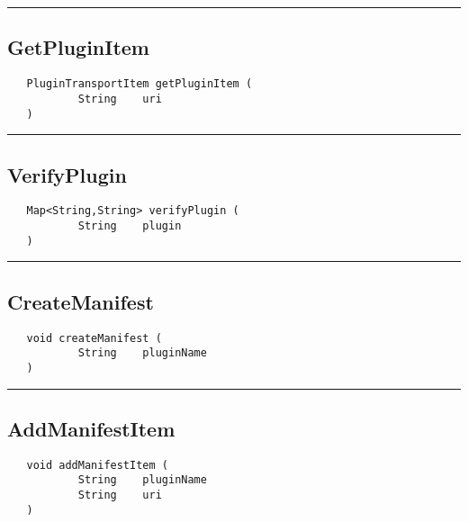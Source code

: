 \rule{15cm}{2pt}
\subsection{GetPluginItem}
\label{Api:GetPluginItem}
\begin{verbatim}
   PluginTransportItem getPluginItem (
           String    uri
   )
\end{verbatim}



\rule{15cm}{2pt}
\subsection{VerifyPlugin}
\label{Api:VerifyPlugin}
\begin{verbatim}
   Map<String,String> verifyPlugin (
           String    plugin
   )
\end{verbatim}



\rule{15cm}{2pt}
\subsection{CreateManifest}
\label{Api:CreateManifest}
\begin{verbatim}
   void createManifest (
           String    pluginName
   )
\end{verbatim}



\rule{15cm}{2pt}
\subsection{AddManifestItem}
\label{Api:AddManifestItem}
\begin{verbatim}
   void addManifestItem (
           String    pluginName
           String    uri
   )
\end{verbatim}



